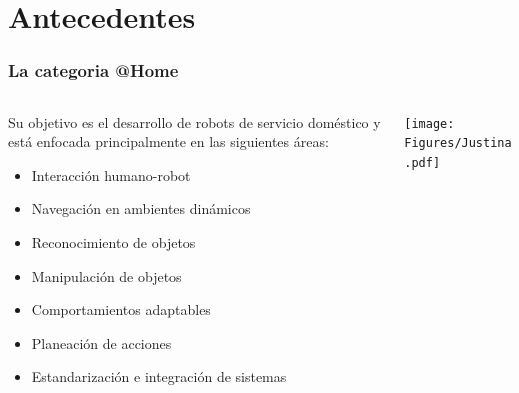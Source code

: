 \documentclass[10pt,spanish,aspectratio=1610]{beamer}
\begin{document}
\section{Antecedentes}
\begin{frame}\frametitle{La categoria @Home}
  \begin{columns}
    \begin{column}{0.5\textwidth}
      Su objetivo es el desarrollo de robots de servicio doméstico y está enfocada principalmente en las siguientes áreas:
      \begin{itemize}
      \item Interacción humano-robot
      \item Navegación en ambientes dinámicos
      \item Reconocimiento de objetos
      \item Manipulación de objetos
      \item Comportamientos adaptables
      \item Planeación de acciones
      \item Estandarización e integración de sistemas
      \end{itemize}
    \end{column}
    \begin{column}{0.4\textwidth}
      \centering
      \texttt{[image: Figures/Justina.pdf]}
    \end{column}
  \end{columns}
\end{frame}
\end{document}
